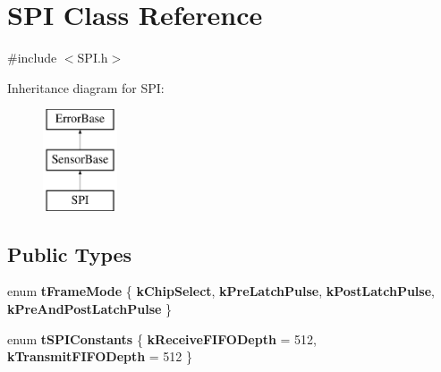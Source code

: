 \hypertarget{classSPI}{\section{\-S\-P\-I \-Class \-Reference}
\label{classSPI}
}


{\ttfamily \#include $<$\-S\-P\-I.\-h$>$}

\-Inheritance diagram for \-S\-P\-I\-:\begin{figure}[H]
\begin{center}
\leavevmode
\includegraphics[height=3.000000cm]{classSPI}
\end{center}
\end{figure}
\subsection*{\-Public \-Types}
\begin{DoxyCompactItemize}
\item 
enum {\bfseries t\-Frame\-Mode} \{ {\bfseries k\-Chip\-Select}, 
{\bfseries k\-Pre\-Latch\-Pulse}, 
{\bfseries k\-Post\-Latch\-Pulse}, 
{\bfseries k\-Pre\-And\-Post\-Latch\-Pulse}
 \}
\item 
enum {\bfseries t\-S\-P\-I\-Constants} \{ {\bfseries k\-Receive\-F\-I\-F\-O\-Depth} = 512, 
{\bfseries k\-Transmit\-F\-I\-F\-O\-Depth} = 512
 \}
\end{DoxyCompactItemize}

